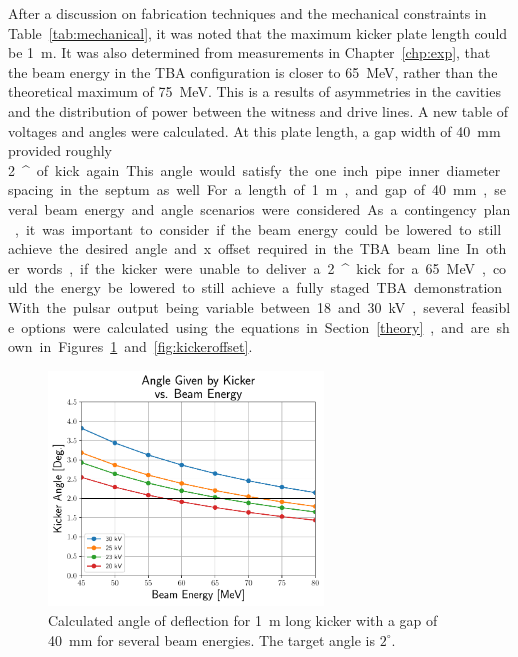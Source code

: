 After a discussion on fabrication techniques and the mechanical constraints in Table~\ref{tab:mechanical}, 
it was noted that the maximum kicker plate length could be \SI{1}{m}. 
It was also determined from measurements in Chapter~\ref{chp:exp}, 
that the beam energy in the TBA configuration is closer to \SI{65}{MeV}, 
rather than the theoretical maximum of \SI{75}{MeV}.
This is a results of asymmetries in the cavities and the distribution of power
between the witness and drive lines.
A new table of voltages and angles were calculated. At this plate length, 
a gap width of \SI{40}{mm} provided roughly \SI{2}{^\circ} of kick again. 
This angle would satisfy the one inch pipe inner diameter spacing in the septum as well. 

For a length of \SI{1}{m}, and gap of \SI{40}{mm}, 
several beam energy and angle scenarios were considered.
As a contingency plan, it was important to consider if the 
beam energy could be lowered to still achieve the desired 
angle and x offset required in the TBA beam line. 
In other words, if the kicker were unable to deliver a \SI{2}{^\circ}
kick for a \SI{65}{MeV}, could the energy be lowered to still achieve
a fully staged TBA demonstration. 
With the pulsar output being variable between 18 and 30 kV,
several feasible options were calculated using the equations in Section~\ref{theory}, 
and are shown in Figures~\ref{fig:kickerangles} and~\ref{fig:kickeroffset}.
\begin{figure}%
	\begin{center}
		\includegraphics[width=0.65\textwidth]{./images/AngleVsEnergy}
		\caption{Calculated angle of deflection for \SI{1}{m} long 
		kicker with a gap of \SI{40}{mm} for several beam energies. The target angle is $2^\circ$.}
		\label{fig:kickerangles}
	\end{center}
\end{figure}
